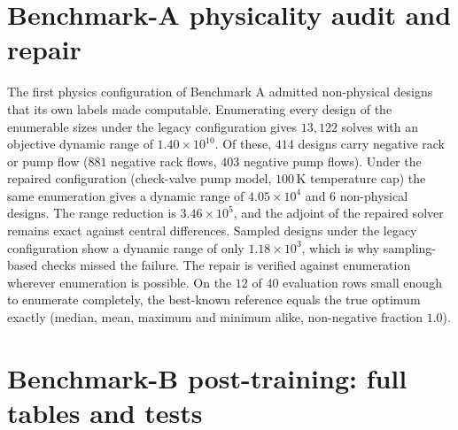 \section{Benchmark-A physicality audit and repair}
\label{supp:audit}
The first physics configuration of Benchmark A admitted non-physical designs that
its own labels made computable.  Enumerating every design of the enumerable sizes
under the legacy configuration gives $13{,}122$ solves with an objective dynamic
range of $1.40\times10^{10}$.  Of these, $414$ designs carry negative rack or pump
flow ($881$ negative rack flows, $403$ negative pump flows).  Under the repaired
configuration (check-valve pump model, $100$\,K temperature cap) the same
enumeration gives a dynamic range of $4.05\times10^{4}$ and $6$ non-physical
designs.  The range reduction is $3.46\times10^{5}$, and the adjoint of the
repaired solver remains exact against central differences.  Sampled designs under
the legacy configuration show a dynamic range of only $1.18\times10^{3}$, which is
why sampling-based checks missed the failure.  The repair is verified against
enumeration wherever enumeration is possible.  On the $12$ of $40$ evaluation rows
small enough to enumerate completely, the best-known reference equals the true
optimum exactly (median, mean, maximum and minimum alike, non-negative fraction
$1.0$).
\section{Benchmark-B post-training: full tables and tests}
\label{supp:e2B}
